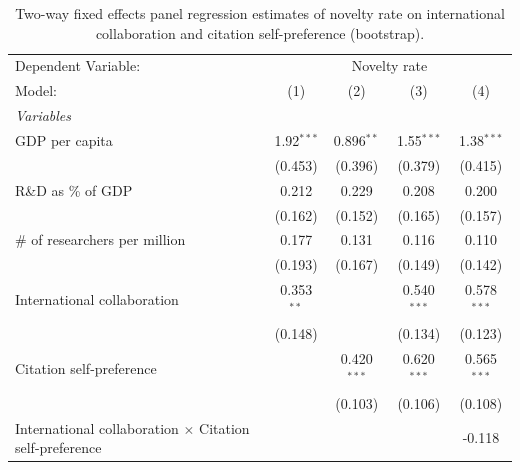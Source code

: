 
\begin{table}[H]
   \caption{\label{tab:H2_novelty} Two-way fixed effects panel regression estimates of novelty rate on international
   collaboration and citation self-preference (bootstrap).}
   \centering
   \scriptsize
   \renewcommand*{\arraystretch}{0.7}
   \begin{tabular}{lcccc}
      \tabularnewline \midrule \midrule
      Dependent Variable: & \multicolumn{4}{c}{Novelty rate}\\
      Model:                                                         & (1)          & (2)           & (3)           & (4)\\  
      \midrule
      \emph{Variables}\\
      GDP per capita                                                 & 1.92$^{***}$ & 0.896$^{**}$  & 1.55$^{***}$  & 1.38$^{***}$\\   
                                                                     & (0.453)      & (0.396)       & (0.379)       & (0.415)\\   
      R\&D as \% of GDP                                              & 0.212        & 0.229         & 0.208         & 0.200\\   
                                                                     & (0.162)      & (0.152)       & (0.165)       & (0.157)\\   
      \# of researchers per million                                  & 0.177        & 0.131         & 0.116         & 0.110\\   
                                                                     & (0.193)      & (0.167)       & (0.149)       & (0.142)\\   
      International collaboration                                    & 0.353$^{**}$ &               & 0.540$^{***}$ & 0.578$^{***}$\\   
                                                                     & (0.148)      &               & (0.134)       & (0.123)\\   
      Citation self-preference                                       &              & 0.420$^{***}$ & 0.620$^{***}$ & 0.565$^{***}$\\   
                                                                     &              & (0.103)       & (0.106)       & (0.108)\\   
      International collaboration $\times$ Citation self-preference  &              &               &               & -0.118\\   

\end{tabular}
\end{table}
